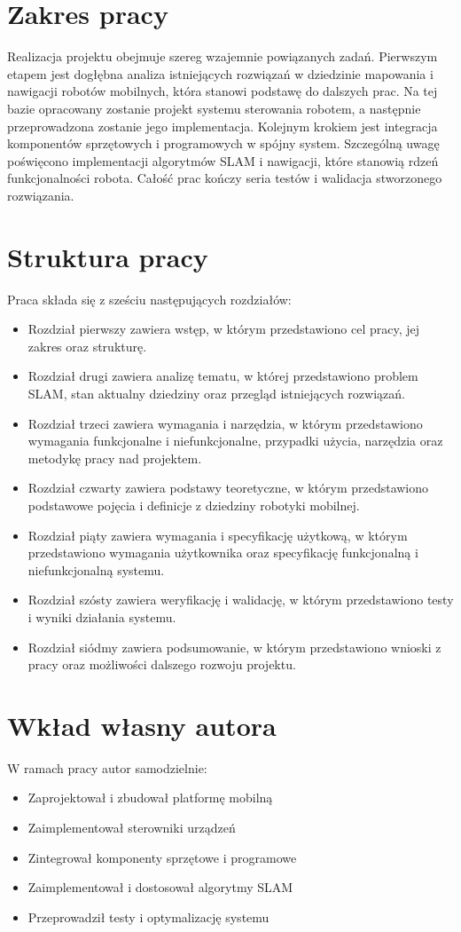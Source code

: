 \documentclass[a4paper,twoside,12pt]{book}
\begin{document}
\section{Zakres pracy}
Realizacja projektu obejmuje szereg wzajemnie powiązanych zadań. Pierwszym etapem jest dogłębna analiza istniejących rozwiązań w dziedzinie mapowania i nawigacji robotów mobilnych, która stanowi podstawę do dalszych prac. Na tej bazie opracowany zostanie projekt systemu sterowania robotem, a następnie przeprowadzona zostanie jego implementacja. Kolejnym krokiem jest integracja komponentów sprzętowych i programowych w spójny system. Szczególną uwagę poświęcono implementacji algorytmów SLAM i nawigacji, które stanowią rdzeń funkcjonalności robota. Całość prac kończy seria testów i walidacja stworzonego rozwiązania.



\section{Struktura pracy}
Praca składa się z sześciu następujących rozdziałów:
\begin{itemize}
\item Rozdział pierwszy zawiera wstęp, w którym przedstawiono cel pracy, jej zakres oraz strukturę.
\item Rozdział drugi zawiera analizę tematu, w której przedstawiono problem SLAM, stan aktualny dziedziny oraz przegląd istniejących rozwiązań.
\item Rozdział trzeci zawiera wymagania i narzędzia, w którym przedstawiono wymagania funkcjonalne i niefunkcjonalne, przypadki użycia, narzędzia oraz metodykę pracy nad projektem.
\item Rozdział czwarty zawiera podstawy teoretyczne, w którym przedstawiono podstawowe pojęcia i definicje z dziedziny robotyki mobilnej.
\item Rozdział piąty zawiera wymagania i specyfikację użytkową, w którym przedstawiono wymagania użytkownika oraz specyfikację funkcjonalną i niefunkcjonalną systemu.
\item Rozdział szósty zawiera weryfikację i walidację, w którym przedstawiono testy i wyniki działania systemu.
\item Rozdział siódmy zawiera podsumowanie, w którym przedstawiono wnioski z pracy oraz możliwości dalszego rozwoju projektu.
\end{itemize}

\section{Wkład własny autora}
W ramach pracy autor samodzielnie:
\begin{itemize}
\item Zaprojektował i zbudował platformę mobilną
\item Zaimplementował sterowniki urządzeń
\item Zintegrował komponenty sprzętowe i programowe
\item Zaimplementował i dostosował algorytmy SLAM
\item Przeprowadził testy i optymalizację systemu
\end{itemize}
\end{document}
